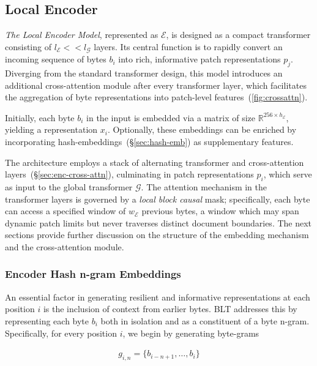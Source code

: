 \subsection{Local Encoder}
\label{section:local}

\textit{The Local Encoder Model}, represented as $\mathcal{E}$, is designed as a compact transformer consisting of $l_{\mathcal{E}} << l_{\mathcal{G}}$ layers. Its central function is to rapidly convert an incoming sequence of bytes $b_i$ into rich, informative patch representations $p_j$. Diverging from the standard transformer design, this model introduces an additional cross-attention module after every transformer layer, which facilitates the aggregation of byte representations into patch-level features~(\autoref{fig:crossattn}).

Initially, each byte $b_i$ in the input is embedded via a matrix of size $\mathbb{R}^{256 \times h_{\mathcal{E}}}$, yielding a representation $x_i$. Optionally, these embeddings can be enriched by incorporating hash-embeddings~(\S\ref{sec:hash-emb}) as supplementary features. 

The architecture employs a stack of alternating transformer and cross-attention layers~(\S\ref{sec:enc-cross-attn}), culminating in patch representations $p_i$, which serve as input to the global transformer $\mathcal{G}$. The attention mechanism in the transformer layers is governed by a \textit{local block causal} mask; specifically, each byte can access a specified window of $w_{\mathcal{E}}$ previous bytes, a window which may span dynamic patch limits but never traverses distinct document boundaries. The next sections provide further discussion on the structure of the embedding mechanism and the cross-attention module.

\subsubsection{Encoder Hash n-gram Embeddings}
\label{sec:ngram-emb}
\label{sec:hash-emb}
An essential factor in generating resilient and informative representations at each position $i$ is the inclusion of context from earlier bytes. {\textsc BLT} addresses this by representing each byte $b_i$ both in isolation and as a constituent of a byte n-gram. Specifically, for every position $i$, we begin by generating byte-grams

\begin{align}
    g_{i,n}=\{b_{i-n + 1},\ldots, b_i\}
\end{align}


